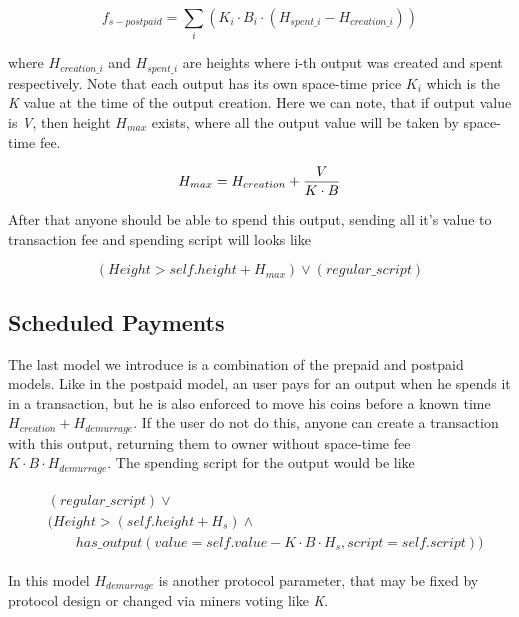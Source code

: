\documentclass[]{article}   %
\begin{document}
\begin{equation}
f_{s-postpaid} = \sum_i{(K_i \cdot B_i \cdot (H_{spent\_i} - H_{creation\_i}))}
\end{equation}

where $H_{creation\_i}$ and $H_{spent\_i}$ are heights where i-th output was created and spent respectively. Note that each output has its own space-time price \textit{$K_i$} which is the \textit{K} value at the time of the output creation. Here we can note, that if output value is \textit{V}, then height \textit{$H_{max}$} exists, where all the output value will be taken by space-time fee.

\begin{equation}
H_{max} = {H_{creation} + {V \over {K \cdot B}}}
\end{equation}

After that anyone should be able to spend this output, sending all it's value to transaction fee and spending script will looks like

\begin{equation}
(Height > self.height + H_{max}) \lor (regular\_script)
\end{equation}

\subsection{Scheduled Payments}
\label{sec-scheduled}

The last model we introduce is a combination of the prepaid and postpaid models. Like in the postpaid model, an user pays for an output when he spends it in a transaction, but he is also enforced to move his coins before a known time $H_{creation} + H_{demurrage}$. If the user do not do this, anyone can create a transaction with this output, returning them to owner without space-time fee ${K \cdot B \cdot H_{demurrage}}$. The spending script for the output would be like

\begin{align}
\begin{split}
&(regular\_script) \lor \\
&(Height > (self.height + H_s) \land \\  
&\qquad has\_output(value = self.value - K \cdot B \cdot H_s, script = self.script))
\end{split}
\end{align}



In this model $H_{demurrage}$ is another protocol parameter, that may be fixed by protocol design or changed via miners voting like \textit{K}.
\end{document}
